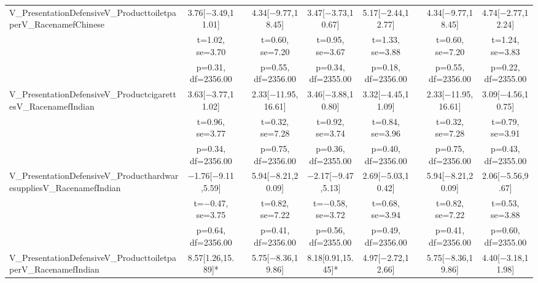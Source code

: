 \documentclass[]{report}
\begin{document}
\begin{table}
{\begin{tabular}[t]{lcccccccc}
		V\_PresentationDefensiveV\_ProducttoiletpaperV\_RacenamefChinese & \num{3.76}[\num{-3.49},\num{11.01}] &  & \num{4.34}[\num{-9.77},\num{18.45}] & \num{3.47}[\num{-3.73},\num{10.67}] & \num{5.17}[\num{-2.44},\num{12.77}] &  & \num{4.34}[\num{-9.77},\num{18.45}] & \num{4.74}[\num{-2.77},\num{12.24}]\\
		& t=\num{1.02}, se=\num{3.70} &  & t=\num{0.60}, se=\num{7.20} & t=\num{0.95}, se=\num{3.67} & t=\num{1.33}, se=\num{3.88} &  & t=\num{0.60}, se=\num{7.20} & t=\num{1.24}, se=\num{3.83}\\
		& p=\num{0.31}, df=\num{2356.00} &  & p=\num{0.55}, df=\num{2356.00} & p=\num{0.34}, df=\num{2355.00} & p=\num{0.18}, df=\num{2356.00} &  & p=\num{0.55}, df=\num{2356.00} & p=\num{0.22}, df=\num{2355.00}\\
		V\_PresentationDefensiveV\_ProductcigarettesV\_RacenamefIndian & \num{3.63}[\num{-3.77},\num{11.02}] &  & \num{2.33}[\num{-11.95},\num{16.61}] & \num{3.46}[\num{-3.88},\num{10.80}] & \num{3.32}[\num{-4.45},\num{11.09}] &  & \num{2.33}[\num{-11.95},\num{16.61}] & \num{3.09}[\num{-4.56},\num{10.75}]\\
		& t=\num{0.96}, se=\num{3.77} &  & t=\num{0.32}, se=\num{7.28} & t=\num{0.92}, se=\num{3.74} & t=\num{0.84}, se=\num{3.96} &  & t=\num{0.32}, se=\num{7.28} & t=\num{0.79}, se=\num{3.91}\\
		& p=\num{0.34}, df=\num{2356.00} &  & p=\num{0.75}, df=\num{2356.00} & p=\num{0.36}, df=\num{2355.00} & p=\num{0.40}, df=\num{2356.00} &  & p=\num{0.75}, df=\num{2356.00} & p=\num{0.43}, df=\num{2355.00}\\
		V\_PresentationDefensiveV\_ProducthardwaresuppliesV\_RacenamefIndian & \num{-1.76}[\num{-9.11},\num{5.59}] &  & \num{5.94}[\num{-8.21},\num{20.09}] & \num{-2.17}[\num{-9.47},\num{5.13}] & \num{2.69}[\num{-5.03},\num{10.42}] &  & \num{5.94}[\num{-8.21},\num{20.09}] & \num{2.06}[\num{-5.56},\num{9.67}]\\
		& t=\num{-0.47}, se=\num{3.75} &  & t=\num{0.82}, se=\num{7.22} & t=\num{-0.58}, se=\num{3.72} & t=\num{0.68}, se=\num{3.94} &  & t=\num{0.82}, se=\num{7.22} & t=\num{0.53}, se=\num{3.88}\\
		& p=\num{0.64}, df=\num{2356.00} &  & p=\num{0.41}, df=\num{2356.00} & p=\num{0.56}, df=\num{2355.00} & p=\num{0.49}, df=\num{2356.00} &  & p=\num{0.41}, df=\num{2356.00} & p=\num{0.60}, df=\num{2355.00}\\
		V\_PresentationDefensiveV\_ProducttoiletpaperV\_RacenamefIndian & \num{8.57}[\num{1.26},\num{15.89}]* &  & \num{5.75}[\num{-8.36},\num{19.86}] & \num{8.18}[\num{0.91},\num{15.45}]* & \num{4.97}[\num{-2.72},\num{12.66}] &  & \num{5.75}[\num{-8.36},\num{19.86}] & \num{4.40}[\num{-3.18},\num{11.98}]\\

\end{tabular}}
\end{table}
\end{document}
